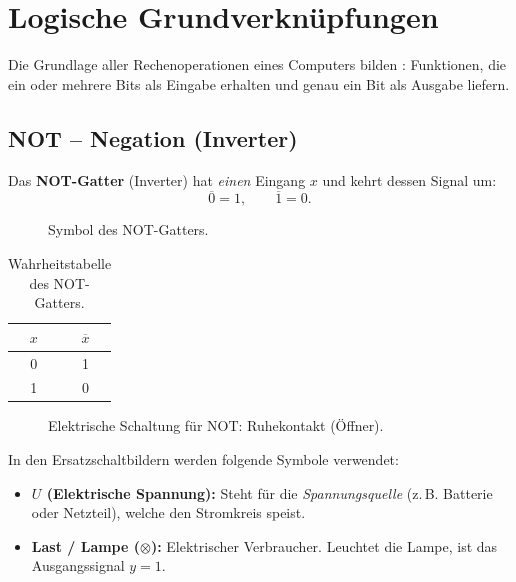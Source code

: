 \section{Logische Grundverknüpfungen}

Die Grundlage aller Rechenoperationen eines Computers bilden : Funktionen, die ein oder mehrere Bits als Eingabe erhalten und genau ein Bit als Ausgabe liefern.

\subsection{NOT -- Negation (Inverter)}

\begin{mydefinition}
    Das \textbf{NOT-Gatter} (Inverter) hat \emph{einen} Eingang $x$ und kehrt dessen Signal um:
    \[
        \overline{0} = 1, \qquad \overline{1} = 0.
    \]
\end{mydefinition}

\begin{figure}[H]
    \centering
    
    \caption{Symbol des NOT-Gatters.}
    \label{fig:not_gatter}
\end{figure}

\begin{table}[H]
    \centering
    \begin{tabular}{cc}
        $x$ & $\overline{x}$ \\\midrule\midrule
        0 & 1 \\\midrule
        1 & 0 \\
    \end{tabular}
    \caption{Wahrheitstabelle des NOT-Gatters.}
    \label{tab:not}
\end{table}

\begin{figure}[H]
    \centering
    
    \caption{Elektrische Schaltung für NOT: Ruhekontakt (Öffner).}
    \label{fig:not_schaltung}
\end{figure}

\begin{myremark}
    In den Ersatzschaltbildern werden folgende Symbole verwendet:
    \begin{itemize}
        \item \textbf{$U$ (Elektrische Spannung):} Steht für die \emph{Spannungsquelle} (z.\,B. Batterie oder Netzteil), welche den Stromkreis speist.
        \item \textbf{Last / Lampe ($\otimes$):} Elektrischer Verbraucher. Leuchtet die Lampe, ist das Ausgangssignal $y=1$.
    \end{itemize}
\end{myremark}

